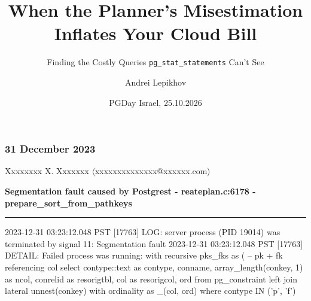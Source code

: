 \documentclass{beamer}
\title[When Misestimation Inflates Your Cloud Bill]{When the Planner's Misestimation Inflates Your Cloud Bill}
\subtitle{Finding the Costly Queries \texttt{pg\_stat\_statements} Can't See}
\author{Andrei Lepikhov}
\institute{pgEdge}
\date{PGDay Israel, 25.10.2026}
\newcommand{\lgl}[2]{\textcolor{black!#1}{#2}}
\newcommand{\hdr}[2]{%
  \makebox[1.25cm][l]{\textcolor{black!40}{\tiny\textsf{#1}}}%
  \textcolor{black!75}{\tiny\textsf{#2}}\par}
\begin{document}

\begin{frame}
\titlepage
\end{frame}


\begin{frame}[fragile]\frametitle{31 December 2023}

\vspace{-0.9em}

\begin{tcolorbox}[
  enhanced, sharp corners=downhill, arc=1pt,
  colback=paper, colframe=mailrule, boxrule=0.4pt,
  left=6pt, right=6pt, top=5pt, bottom=2pt,
  drop shadow={black!12}]

\hdr{From}{Xxxxxxxx X. Xxxxxxx
           \textcolor{black!35}{$\langle$xxxxxxxxxxxxxx@xxxxxx.com$\rangle$}}
\hdr{Subject}{\textbf{Segmentation fault caused by Postgrest -
              reateplan.c:6178 - prepare\_sort\_from\_pathkeys}}

\vspace{-1pt}\textcolor{mailrule}{\hrule height 0.4pt}\vspace{6pt}

{\ttfamily\fontsize{6.8}{9.0}\selectfont
 \setlength{\parskip}{0pt}\setlength{\topsep}{0pt}\setlength{\partopsep}{0pt}
\begin{semiverbatim}
\lgl{62}{2023-12-31 03:23:12.048 PST [17763] LOG: server process (PID 19014) was}
\lgl{62}{terminated by \textcolor{crash}{signal 11: Segmentation fault}}
\lgl{62}{2023-12-31 03:23:12.048 PST [17763] DETAIL: Failed process was running:}
\lgl{50}{      with recursive}
\lgl{48}{      pks_fks as (}
\lgl{34}{        -- pk + fk referencing col}
\lgl{44}{        select}
\lgl{40}{          contype::text as contype,}
\lgl{36}{          conname,}
\lgl{31}{          array_length(conkey, 1) as ncol,}
\lgl{26}{          conrelid as resorigtbl,}
\lgl{21}{          col as resorigcol,}
\lgl{16}{          ord}
\lgl{12}{        from pg_constraint}
\lgl{8}{        left join lateral unnest(conkey) with ordinality as _(col, ord)}
\lgl{4}{        where contype IN ('p', 'f')}
\end{semiverbatim}
}
\end{tcolorbox}

\end{frame}
\end{document}
